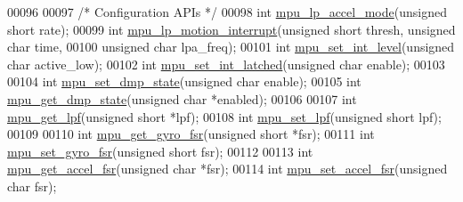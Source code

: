 \begin{DoxyCode}
00096 
00097 \textcolor{comment}{/* Configuration APIs */}
00098 \textcolor{keywordtype}{int} \hyperlink{group___d_r_i_v_e_r_s_gabdcf10922a1a20f1b5bbd7576d3189b9}{mpu\_lp\_accel\_mode}(\textcolor{keywordtype}{unsigned} \textcolor{keywordtype}{short} rate);
00099 \textcolor{keywordtype}{int} \hyperlink{group___d_r_i_v_e_r_s_ga7d0b3259346898ccd1ba6ef78bf7df97}{mpu\_lp\_motion\_interrupt}(\textcolor{keywordtype}{unsigned} \textcolor{keywordtype}{short} thresh, \textcolor{keywordtype}{unsigned} \textcolor{keywordtype}{char} time,
00100     \textcolor{keywordtype}{unsigned} \textcolor{keywordtype}{char} lpa\_freq);
00101 \textcolor{keywordtype}{int} \hyperlink{group___d_r_i_v_e_r_s_gacc92fb1489ef32a04bcb6b0ebde4d657}{mpu\_set\_int\_level}(\textcolor{keywordtype}{unsigned} \textcolor{keywordtype}{char} active\_low);
00102 \textcolor{keywordtype}{int} \hyperlink{group___d_r_i_v_e_r_s_ga653cb855300bff9285ce4b8dca6a503b}{mpu\_set\_int\_latched}(\textcolor{keywordtype}{unsigned} \textcolor{keywordtype}{char} enable);
00103 
00104 \textcolor{keywordtype}{int} \hyperlink{group___d_r_i_v_e_r_s_ga68ed20e6c9663cd7c50469329af8715f}{mpu\_set\_dmp\_state}(\textcolor{keywordtype}{unsigned} \textcolor{keywordtype}{char} enable);
00105 \textcolor{keywordtype}{int} \hyperlink{group___d_r_i_v_e_r_s_gafe0f60ed0d7f8fd2dcd55d45b95a2363}{mpu\_get\_dmp\_state}(\textcolor{keywordtype}{unsigned} \textcolor{keywordtype}{char} *enabled);
00106 
00107 \textcolor{keywordtype}{int} \hyperlink{group___d_r_i_v_e_r_s_gaa95c7e216dcb2d888e9796001ca555f8}{mpu\_get\_lpf}(\textcolor{keywordtype}{unsigned} \textcolor{keywordtype}{short} *lpf);
00108 \textcolor{keywordtype}{int} \hyperlink{group___d_r_i_v_e_r_s_ga5661a9dee25152166769910767a2a93d}{mpu\_set\_lpf}(\textcolor{keywordtype}{unsigned} \textcolor{keywordtype}{short} lpf);
00109 
00110 \textcolor{keywordtype}{int} \hyperlink{group___d_r_i_v_e_r_s_gaf973c32c73ba912ff512aab948fc31ca}{mpu\_get\_gyro\_fsr}(\textcolor{keywordtype}{unsigned} \textcolor{keywordtype}{short} *fsr);
00111 \textcolor{keywordtype}{int} \hyperlink{group___d_r_i_v_e_r_s_gad09e6031c8677adc0b8a39b6deea8e27}{mpu\_set\_gyro\_fsr}(\textcolor{keywordtype}{unsigned} \textcolor{keywordtype}{short} fsr);
00112 
00113 \textcolor{keywordtype}{int} \hyperlink{group___d_r_i_v_e_r_s_gab6087a15ee23db23b6aec41590329a60}{mpu\_get\_accel\_fsr}(\textcolor{keywordtype}{unsigned} \textcolor{keywordtype}{char} *fsr);
00114 \textcolor{keywordtype}{int} \hyperlink{group___d_r_i_v_e_r_s_ga2713a96af104cfb2ae8e0ed4c3718119}{mpu\_set\_accel\_fsr}(\textcolor{keywordtype}{unsigned} \textcolor{keywordtype}{char} fsr);

\end{DoxyCode}

